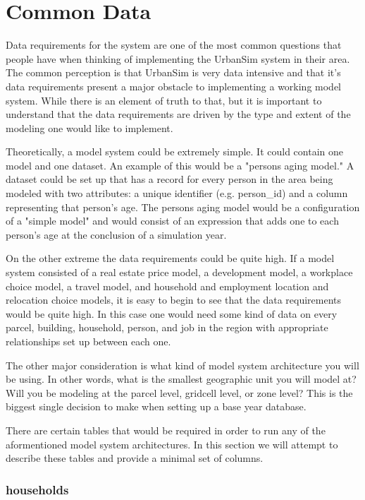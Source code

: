 \chapter{Common Data}

Data requirements for the system are one of the most common questions that people have when thinking of implementing the UrbanSim system in their area.  The common perception is that UrbanSim is very data intensive and that it's data requirements present a major obstacle to implementing a working model system.  While there is an element of truth to that, but it is important to understand that the data requirements are driven by the type and extent of the modeling one would like to implement.

Theoretically, a model system could be extremely simple.  It could contain one model and one dataset.  An example of this would be a "persons aging model."  A dataset could be set up that has a record for every person in the area being modeled with two attributes: a unique identifier (e.g. person_id) and a column representing that person's age.  The persons aging model would be a configuration of a "simple model" and would consist of an expression that adds one to each person's age at the conclusion of a simulation year.

On the other extreme the data requirements could be quite high.  If a model system consisted of a real estate price model, a development model, a workplace choice model, a travel model, and household and employment location and relocation choice models, it is easy to begin to see that the data requirements would be quite high.  In this case one would need some kind of data on every parcel, building, household, person, and job in the region with appropriate relationships set up between each one.

The other major consideration is what kind of model system architecture you will be using.  In other words, what is the smallest geographic unit you will model at? Will you be modeling at the parcel level, gridcell level, or zone level?  This is the biggest single decision to make when setting up a base year database.

There are certain tables that would be required in order to run any of the aformentioned model system architectures.  In this section we will attempt to describe these tables and provide a minimal set of columns.

\subsection{households} 

